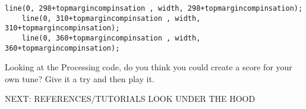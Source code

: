 \documentclass[twoside,a4paper]{refart}
\begin{document}
\begin{changemargin}{-1.5cm}{0.0cm} 
	\begin{lstlisting}[style=Processing]
	line(0, 298+topmargincompinsation , width, 298+topmargincompinsation);
	line(0, 310+topmargincompinsation , width, 310+topmargincompinsation);
	line(0, 360+topmargincompinsation , width, 360+topmargincompinsation);
	\end{lstlisting}
\end{changemargin}

Looking at the Processing code, do you think you could create a score for your own tune?  Give it a try and then play it.

NEXT:
REFERENCES/TUTORIALS
LOOK UNDER THE HOOD







\printindex
\end{document}
